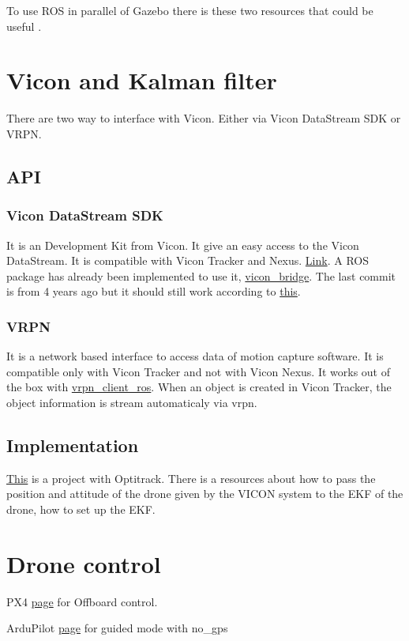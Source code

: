 To use ROS in parallel of Gazebo there is these two resources that could be useful \cite{youtube_gazebo_ros} \cite{github_gazebo_ros}.



\section{Vicon and Kalman filter}
There are two way to interface with Vicon. Either via Vicon DataStream SDK or VRPN.

\subsection{API}
\subsubsection{Vicon DataStream SDK}
It is an Development Kit from Vicon. It give an easy access to the Vicon DataStream. It is compatible with Vicon Tracker and Nexus. \href{https://www.vicon.com/downloads/utilities-and-sdk/datastream-sdk}{Link}. A ROS package has already been implemented to use it, \href{https://github.com/ethz-asl/vicon_bridge}{vicon\_bridge}.
The last commit is from 4 years ago but it should still work according to \href{https://answers.ros.org/question/329849/which-ros-package-use-with-vicon/}{this}.

\subsubsection{VRPN}
It is a network based interface to access data of motion capture software. It is compatible only with Vicon Tracker and not with Vicon Nexus. It works out of the box with \href{https://wiki.ros.org/vrpn_client_ros}{vrpn\_client\_ros}. When an object is created in Vicon Tracker, the object information is stream automaticaly via vrpn.

\subsection{Implementation}
\href{http://ardupilot.org/copter/docs/common-optitrack.html#common-optitrack}{This} is a project with Optitrack. There is a resources about how to pass the position and attitude of the drone given by the VICON system to the EKF of the drone, how to set up the EKF.

\section{Drone control}
PX4 \href{https://discuss.ardupilot.org/t/offboard-control/37869}{page} for Offboard control.

ArduPilot \href{http://ardupilot.org/copter/docs/ac2_guidedmode.html#guided-nogps}{page} for guided mode with no\_gps
